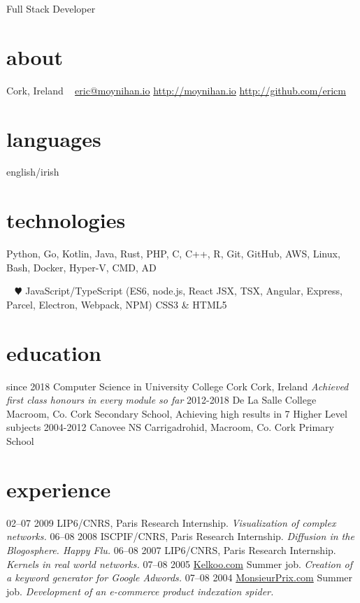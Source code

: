 \documentclass[]{friggeri-cv}
\begin{document}
       {Full Stack Developer}


\begin{aside}
  \section{about}
    Cork,
    Ireland
    ~
    \href{mailto:eric@moynihan.io}{eric@moynihan.io}
    \href{http://moynihan.io}{http://moynihan.io}
    \href{http://github.com/ericm}{http://github.com/ericm}
  \section{languages}
    english/irish
  \section{technologies}
    Python, Go, Kotlin,
    Java, Rust, PHP,
    C, C++, R,
    Git, GitHub, AWS,
    Linux, Bash, Docker,
    Hyper-V, CMD, AD
    
    ~
    {\color{red} $\varheartsuit$} JavaScript/TypeScript
    (ES6, node.js, React JSX, TSX, Angular, Express, Parcel, Electron, Webpack, NPM)
    CSS3 \& HTML5
    
\end{aside}



\section{education}

\begin{entrylist}
  \entry
    {since 2018}
    {Computer Science in {\normalfont University College Cork}}
    {Cork, Ireland}
    {\emph{Achieved first class honours in every module so far}}
  \entry
    {2012-2018}
    {De La Salle College}
    {Macroom, Co. Cork}
    {Secondary School, Achieving high results in 7 Higher Level subjects}
  \entry
    {2004-2012}
    {Canovee NS}
    {Carrigadrohid, Macroom, Co. Cork}
    {Primary School}
\end{entrylist}

\section{experience}

\begin{entrylist}
  \entry
    {02–07 2009}
    {LIP6/CNRS, Paris}
    {Research Internship.}
    {\emph{Visualization of complex networks.}}
  \entry
    {06–08 2008}
    {ISCPIF/CNRS, Paris}
    {Research Internship.}
    {\emph{Diffusion in the Blogosphere. Happy Flu.}}
  \entry
    {06–08 2007}
    {LIP6/CNRS, Paris}
    {Research Internship.}
    {\emph{Kernels in real world networks.}}
  \entry
    {07–08 2005}
    {\href{http://www.kelkoo.com}{Kelkoo.com}}
    {Summer job.}
    {\emph{Creation of a keyword generator for Google Adwords.}}
  \entry
    {07–08 2004}
    {\href{http://www.monsieurprix.com}{MonsieurPrix.com}}
    {Summer job.}
    {\emph{Development of an e-commerce product indexation spider.}}
\end{entrylist}
\end{document}
